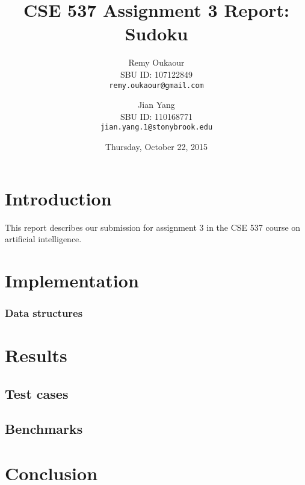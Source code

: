\documentclass[11pt]{article}
\title{CSE 537 Assignment 3 Report: Sudoku}
\author{
Remy Oukaour \\
	{\small SBU ID: 107122849}\\
	{\small \texttt{remy.oukaour@gmail.com}}
\and
Jian Yang \\
	{\small SBU ID: 110168771}\\
	{\small \texttt{jian.yang.1@stonybrook.edu}}
}
\date{Thursday, October 22, 2015}
\begin{document}
\maketitle

\section{Introduction}

This report describes our submission for assignment 3 in the CSE 537 course on
artificial intelligence.

\section{Implementation}

\subsubsection{Data structures}

\section{Results}

\subsection{Test cases}

\subsection{Benchmarks}

\section{Conclusion}
\end{document}
